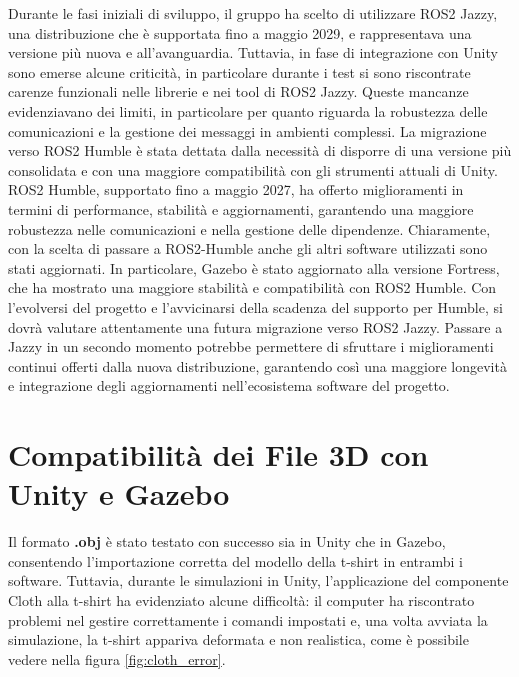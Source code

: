 \documentclass[11pt]{report}
\begin{document}
Durante le fasi iniziali di sviluppo, il gruppo ha scelto di utilizzare ROS2 Jazzy, una distribuzione che è supportata fino a maggio 2029, e rappresentava una versione più nuova e all’avanguardia. Tuttavia, in fase di integrazione con Unity sono emerse alcune criticità, in particolare durante i test si sono riscontrate carenze funzionali nelle librerie e nei tool di ROS2 Jazzy. Queste mancanze evidenziavano dei limiti, in particolare per quanto riguarda la robustezza delle comunicazioni e la gestione dei messaggi in ambienti complessi.
\newline
La migrazione verso ROS2 Humble è stata dettata dalla necessità di disporre di una versione più consolidata e con una maggiore compatibilità con gli strumenti attuali di Unity. ROS2 Humble, supportato fino a maggio 2027, ha offerto miglioramenti in termini di performance, stabilità e aggiornamenti, garantendo una maggiore robustezza nelle comunicazioni e nella gestione delle dipendenze. \cite{Supporto-versioni-ROS}
\newline
Chiaramente, con la scelta di passare a ROS2-Humble anche gli altri software utilizzati sono stati aggiornati. In particolare, Gazebo è stato aggiornato alla versione Fortress, che ha mostrato una maggiore stabilità e compatibilità con ROS2 Humble. \cite{Gazebo-ROS2}
\newline
Con l’evolversi del progetto e l’avvicinarsi della scadenza del supporto per Humble, si dovrà valutare attentamente una futura migrazione verso ROS2 Jazzy. Passare a Jazzy in un secondo momento potrebbe permettere di sfruttare i miglioramenti continui offerti dalla nuova distribuzione, garantendo così una maggiore longevità e integrazione degli aggiornamenti nell’ecosistema software del progetto.
\section{Compatibilità dei File 3D con Unity e Gazebo}
\label{sec:Problemi_Compatibilità_3D}
Il formato \textbf{.obj} è stato testato con successo sia in Unity che in Gazebo, consentendo l'importazione corretta del modello della t-shirt in entrambi i software. Tuttavia, durante le simulazioni in Unity, l'applicazione del componente Cloth alla t-shirt ha evidenziato alcune difficoltà: il computer ha riscontrato problemi nel gestire correttamente i comandi impostati e, una volta avviata la simulazione, la t-shirt appariva deformata e non realistica, come è possibile vedere nella figura \ref{fig:cloth_error}.
\end{document}
